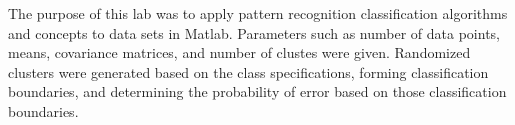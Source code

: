 The purpose of this lab was to apply pattern recognition classification
algorithms and concepts to data sets in Matlab.  Parameters such  as
number of data points, means, covariance matrices,  and number of clustes  were
given.  Randomized clusters were generated based on the class 
specifications, forming classification boundaries, and determining the
probability of error based on those classification boundaries.

